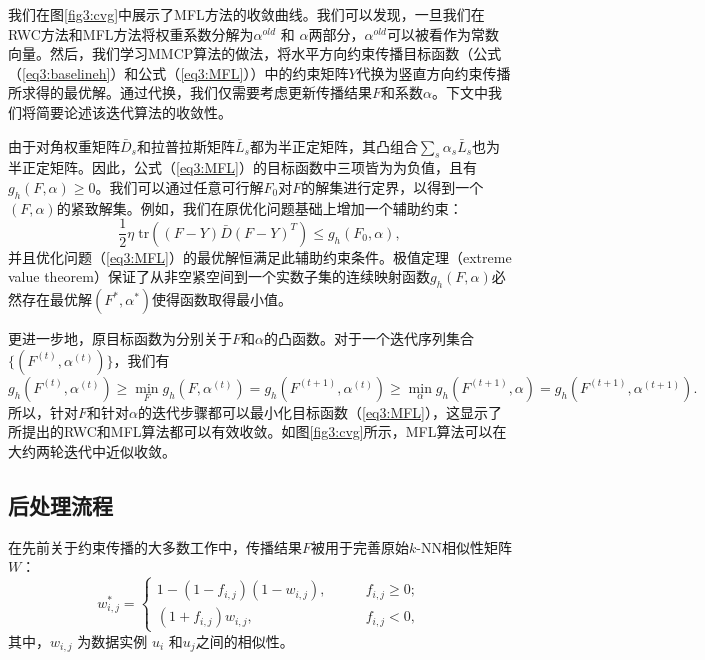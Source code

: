 我们在图\ref{fig3:cvg}中展示了MFL方法的收敛曲线。我们可以发现，一旦我们在RWC方法和MFL方法将权重系数分解为$ {\alpha}^{old} $ 和 $ {\alpha} $两部分，$ {\alpha}^{old} $可以被看作为常数向量。然后，我们学习MMCP算法的做法，将水平方向约束传播目标函数（公式（\ref{eq3:baselineh}）和公式（\ref{eq3:MFL}））中的约束矩阵$Y$代换为竖直方向约束传播所求得的最优解。通过代换，我们仅需要考虑更新传播结果$F$和系数$\alpha$。下文中我们将简要论述该迭代算法的收敛性。

由于对角权重矩阵$ \bar{{D}}_s $和拉普拉斯矩阵$\bar{L}_s$都为半正定矩阵，其凸组合$ \sum_s\alpha_s\bar{{L}}_s $也为半正定矩阵。因此，公式（\ref{eq3:MFL}）的目标函数中三项皆为为负值，且有$ g_h({F}, {\alpha}) \ge 0 $。我们可以通过任意可行解$F_0$对$F$的解集进行定界，以得到一个$(F, \alpha)$的紧致解集。例如，我们在原优化问题基础上增加一个辅助约束：
\begin{equation}
        \frac{1}{2}\eta\;\mathrm{tr}(({F}-{Y})\bar{{D}}({F}-{Y})^T)  \le g_h({F}_0, {\alpha}),
\end{equation}
并且优化问题（\ref{eq3:MFL}）的最优解恒满足此辅助约束条件。极值定理（extreme value theorem）保证了从非空紧空间到一个实数子集的连续映射函数$ g_h({F}, {\alpha})$必然存在最优解$({F}^*, {\alpha}^*) $使得函数取得最小值。

更进一步地，原目标函数为分别关于$F$和$\alpha$的凸函数。对于一个迭代序列集合$ \{({F}^{(t)}, {\alpha}^{(t)})\} $，我们有
\begin{equation}
    g_h({F}^{(t)}, {\alpha}^{(t)}) \ge \mathop{\mathrm{min}}_{{F}} g_h({F}, {\alpha}^{(t)}) = g_h({F}^{(t+1)}, {\alpha}^{(t)}) \ge \mathop{\mathrm{min}}_ {{\alpha}} g_h({F}^{(t+1)}, {\alpha}) =g_h({F}^{(t+1)}, {\alpha}^{(t+1)}).
\end{equation}
所以，针对$F$和针对$\alpha$的迭代步骤都可以最小化目标函数（\ref{eq3:MFL}），这显示了所提出的RWC和MFL算法都可以有效收敛。如图\ref{fig3:cvg}所示，MFL算法可以在大约两轮迭代中近似收敛。

\subsection{后处理流程}
在先前关于约束传播的大多数工作中，传播结果$F$被用于完善原始$k$-NN相似性矩阵$W$：
\begin{equation}
w^*_{i,j} = 
\begin{cases}
1-(1-f_{i,j})(1-w_{i,j}), \qquad &f_{i,j}\ge 0;\\
(1+f_{i,j})w_{i,j}, &f_{i,j}< 0,
\end{cases}
\label{eq3:refine}
\end{equation}
其中，$ w_{i,j} $ 为数据实例 $ u_i $ 和$ u_j $之间的相似性。

